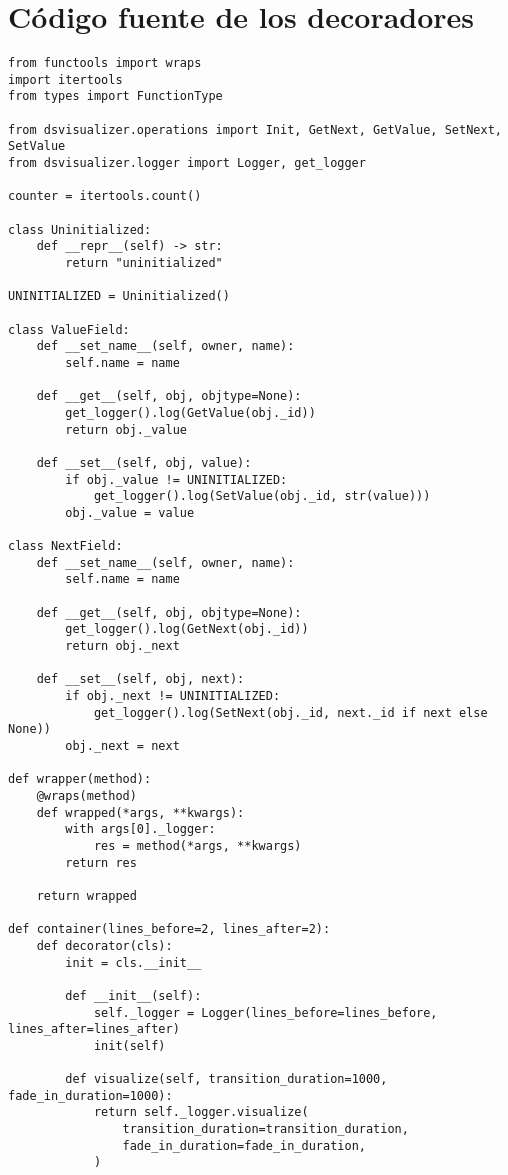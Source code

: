 \chapter{Código fuente de los decoradores}
\label{anexo:codigo-fuente-decoradores}

\begin{verbatim}
from functools import wraps
import itertools
from types import FunctionType

from dsvisualizer.operations import Init, GetNext, GetValue, SetNext, SetValue
from dsvisualizer.logger import Logger, get_logger

counter = itertools.count()

class Uninitialized:
    def __repr__(self) -> str:
        return "uninitialized"

UNINITIALIZED = Uninitialized()

class ValueField:
    def __set_name__(self, owner, name):
        self.name = name

    def __get__(self, obj, objtype=None):
        get_logger().log(GetValue(obj._id))
        return obj._value

    def __set__(self, obj, value):
        if obj._value != UNINITIALIZED:
            get_logger().log(SetValue(obj._id, str(value)))
        obj._value = value

class NextField:
    def __set_name__(self, owner, name):
        self.name = name

    def __get__(self, obj, objtype=None):
        get_logger().log(GetNext(obj._id))
        return obj._next

    def __set__(self, obj, next):
        if obj._next != UNINITIALIZED:
            get_logger().log(SetNext(obj._id, next._id if next else None))
        obj._next = next

def wrapper(method):
    @wraps(method)
    def wrapped(*args, **kwargs):
        with args[0]._logger:
            res = method(*args, **kwargs)
        return res

    return wrapped

def container(lines_before=2, lines_after=2):
    def decorator(cls):
        init = cls.__init__

        def __init__(self):
            self._logger = Logger(lines_before=lines_before, lines_after=lines_after)
            init(self)

        def visualize(self, transition_duration=1000, fade_in_duration=1000):
            return self._logger.visualize(
                transition_duration=transition_duration,
                fade_in_duration=fade_in_duration,
            )


\end{verbatim}
